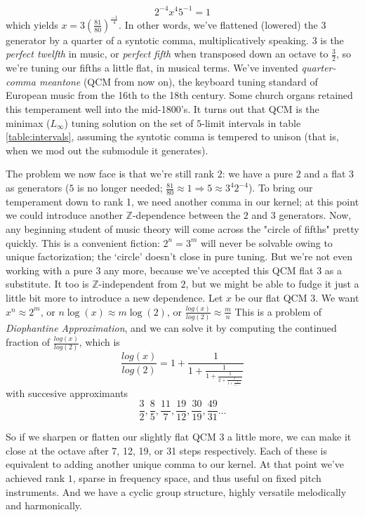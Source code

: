 \documentclass[12pt]{article}
\newcommand{\ZZ}{\mathbb{Z}}      %
\begin{document}
\[2^{-4}x^4 5^{-1}=1\]
which yields $x=3(\frac{81}{80})^{\tfrac{-1}{4}}.$  In other words, we've flattened (lowered) the $3$ generator by a quarter of a syntotic comma, multiplicatively speaking.  $3$ is the \emph{perfect twelfth} in music, or \emph{perfect fifth} when transposed down an octave to $\tfrac{3}{2}$, so we're tuning our fifths a little flat, in musical terms.   We've invented \emph{quarter-comma meantone} (QCM from now on), the keyboard tuning standard of European music from the 16th to the 18th century.  Some church organs retained this temperament well into the mid-1800's.  It turns out that QCM is the minimax ($L_{\infty}$) tuning solution on the set of $5$-limit intervals in table \ref{table:intervals}, assuming the syntotic comma is tempered to unison (that is, when we mod out the submodule it generates).\\
\par
The problem we now face is that we're still rank $2$: we have a pure $2$ and a flat $3$ as generators ($5$ is no longer needed; $\tfrac{81}{80}\approx 1\Rightarrow 5\approx 3^4 2^{-4}$).  To bring our temperament down to rank 1, we need another comma in our kernel; at this point we could introduce another $\ZZ$-dependence between the $2$ and $3$ generators.  Now, any beginning student of music theory will come across the "circle of fifths" pretty quickly.  This is a convenient fiction: $2^n=3^m$ will never be solvable owing to unique factorization; the `circle' doesn't close in pure tuning.  But we're not even working with a pure $3$ any more, because we've accepted this QCM flat $3$ as a substitute.  It too is $\ZZ$-independent from $2$, but we might be able to fudge it just a little bit more to introduce a new dependence.  Let $x$ be our flat QCM $3$.  We want $x^n\approx 2^m$, or $n\log(x)\approx m\log(2)$, or $\frac{log(x)}{log(2)}\approx \frac{m}{n}$   This is a problem of \emph{Diophantine Approximation}, and we can solve it by computing the continued fraction of $\frac{log(x)}{log(2)}$, which is
\[\frac{log(x)}{log(2)}= 1+\frac{1}{1+\frac{1}{1+\frac{1}{2+\frac{1}{1+\frac{1}{1+\ldots}}}}}\]
with succesive approximants
\begin{equation}
\frac{3}{2},\frac{8}{5},\frac{11}{7},\frac{19}{12},\frac{30}{19},\frac{49}{31}\ldots
\label{meantone}
\end{equation}\vspace{.5pt}
\par
So if we sharpen or flatten our slightly flat QCM $3$ a little more, we can make it close at the octave after 7, 12, 19, or 31 steps respectively.  Each of these is equivalent to adding another unique comma to our kernel.  At that point we've achieved rank $1$, sparse in frequency space, and thus useful on fixed pitch instruments.  And we have a cyclic group structure, highly versatile melodically and harmonically.\\
\end{document}
